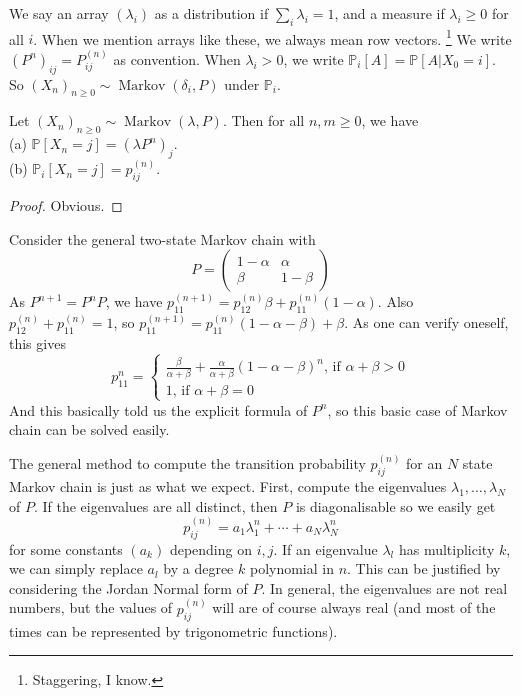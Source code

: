 We say an array $(\lambda_i)$ as a distribution if $\sum_i\lambda_i=1$, and a measure if $\lambda_i\ge 0$ for all $i$.
When we mention arrays like these, we always mean row vectors.
\footnote{Staggering, I know.}
We write $(P^n)_{ij}=P^{(n)}_{ij}$ as convention.
When $\lambda_i>0$, we write $\mathbb P_i[A]=\mathbb P[A|X_0=i]$.
So $(X_n)_{n\ge 0}\sim\operatorname{Markov}(\delta_i,P)$ under $\mathbb P_i$.
\begin{theorem}
    Let $(X_n)_{n\ge 0}\sim\operatorname{Markov}(\lambda,P)$.
    Then for all $n,m\ge 0$, we have\\
    (a) $\mathbb P[X_n=j]=(\lambda P^n)_j$.\\
    (b) $\mathbb P_i[X_n=j]=p_{ij}^{(n)}$.
\end{theorem}
\begin{proof}
    Obvious.
\end{proof}
\begin{example}
    Consider the general two-state Markov chain with
    $$P=\begin{pmatrix}
        1-\alpha&\alpha\\
        \beta&1-\beta
    \end{pmatrix}$$
    As $P^{n+1}=P^nP$, we have $p_{11}^{(n+1)}=p_{12}^{(n)}\beta+p_{11}^{(n)}(1-\alpha)$.
    Also $p_{12}^{(n)}+p_{11}^{(n)}=1$, so $p_{11}^{(n+1)}=p_{11}^{(n)}(1-\alpha-\beta)+\beta$.
    As one can verify oneself, this gives
    $$p_{11}^n=\begin{cases}
        \frac{\beta}{\alpha+\beta}+\frac{\alpha}{\alpha+\beta}(1-\alpha-\beta)^n\text{, if $\alpha+\beta>0$}\\
        1\text{, if $\alpha+\beta=0$}
    \end{cases}$$
    And this basically told us the explicit formula of $P^n$, so this basic case of Markov chain can be solved easily.
\end{example}
The general method to compute the transition probability $p_{ij}^{(n)}$ for an $N$ state Markov chain is just as what we expect.
First, compute the eigenvalues $\lambda_1,\ldots,\lambda_N$ of $P$.
If the eigenvalues are all distinct, then $P$ is diagonalisable so we easily get
$$p_{ij}^{(n)}=a_1\lambda_1^n+\cdots+a_N\lambda_N^n$$ for some constants $(a_k)$ depending on $i,j$.
If an eigenvalue $\lambda_l$ has multiplicity $k$, we can simply replace $a_l$ by a degree $k$ polynomial in $n$.
This can be justified by considering the Jordan Normal form of $P$.
In general, the eigenvalues are not real numbers, but the values of $p_{ij}^{(n)}$ will are of course always real (and most of the times can be represented by trigonometric functions).

